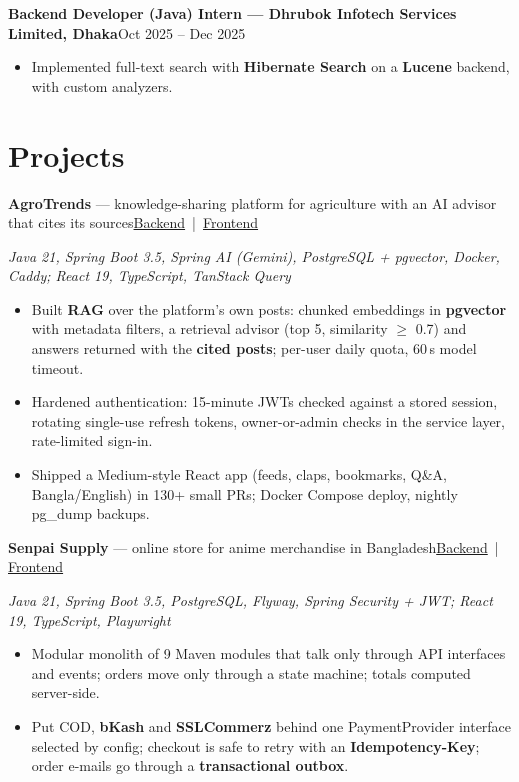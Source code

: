\documentclass[10pt, letterpaper]{article}
\newenvironment{highlights}{
    \begin{itemize}[topsep=1pt, parsep=1pt, partopsep=0pt, itemsep=0pt, leftmargin=12pt]
}{
    \end{itemize}
}
\newcommand{\entry}[2]{\textbf{#1}\hfill #2\par}
\newcommand{\project}[3]{\textbf{#1} --- #2\hfill{\small #3}\par}
\newcommand{\tech}[1]{{\small\textit{#1}}\par}
\begin{document}
\vspace{2pt}
\entry{Backend Developer (Java) Intern --- Dhrubok Infotech Services Limited, Dhaka}{Oct 2025 -- Dec 2025}
\begin{highlights}
    \item Implemented full-text search with \textbf{Hibernate Search} on a \textbf{Lucene} backend, with custom analyzers.
\end{highlights}

\section{Projects}

\project{AgroTrends}{knowledge-sharing platform for agriculture with an AI advisor that cites its sources}{\href{https://github.com/nay-eem-01/AgroTrends}{Backend} \,|\, \href{https://github.com/nay-eem-01/agrotrends_web}{Frontend}}
\tech{Java 21, Spring Boot 3.5, Spring AI (Gemini), PostgreSQL + pgvector, Docker, Caddy; React 19, TypeScript, TanStack Query}
\begin{highlights}
    \item Built \textbf{RAG} over the platform's own posts: chunked embeddings in \textbf{pgvector} with metadata filters, a retrieval advisor (top 5, similarity $\geq$ 0.7) and answers returned with the \textbf{cited posts}; per-user daily quota, 60\,s model timeout.
    \item Hardened authentication: 15-minute JWTs checked against a stored session, rotating single-use refresh tokens, owner-or-admin checks in the service layer, rate-limited sign-in.
    \item Shipped a Medium-style React app (feeds, claps, bookmarks, Q\&A, Bangla/English) in 130+ small PRs; Docker Compose deploy, nightly pg\_dump backups.
\end{highlights}

\vspace{1pt}
\project{Senpai Supply}{online store for anime merchandise in Bangladesh}{\href{https://github.com/nay-eem-01/E-commerce-application-with-springboot}{Backend} \,|\, \href{https://github.com/nay-eem-01/ecommerce_web}{Frontend}}
\tech{Java 21, Spring Boot 3.5, PostgreSQL, Flyway, Spring Security + JWT; React 19, TypeScript, Playwright}
\begin{highlights}
    \item Modular monolith of 9 Maven modules that talk only through API interfaces and events; orders move only through a state machine; totals computed server-side.
    \item Put COD, \textbf{bKash} and \textbf{SSLCommerz} behind one PaymentProvider interface selected by config; checkout is safe to retry with an \textbf{Idempotency-Key}; order e-mails go through a \textbf{transactional outbox}.
\end{highlights}
\end{document}

